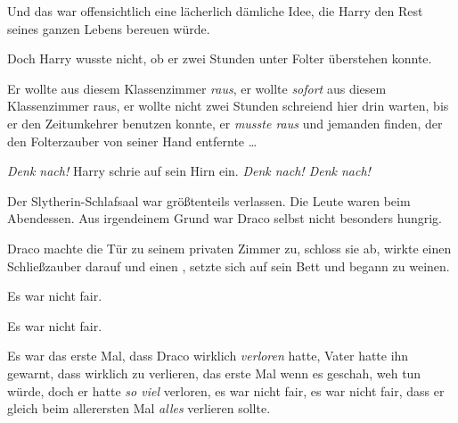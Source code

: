 Und das war offensichtlich eine lächerlich dämliche Idee, die Harry den Rest seines ganzen Lebens bereuen würde.

Doch Harry wusste nicht, ob er zwei Stunden unter Folter überstehen konnte.

Er wollte aus diesem Klassenzimmer \emph{raus}, er wollte \emph{sofort} aus diesem Klassenzimmer raus, er wollte nicht zwei Stunden schreiend hier drin warten, bis er den Zeitumkehrer benutzen konnte, er \emph{musste raus} und jemanden finden, der den Folterzauber von seiner Hand entfernte …

\emph{Denk nach!} Harry schrie auf sein Hirn ein. \emph{Denk nach! Denk nach!}

\later

Der Slytherin-Schlafsaal war größtenteils verlassen. Die Leute waren beim Abendessen. Aus irgendeinem Grund war Draco selbst nicht besonders hungrig.

Draco machte die Tür zu seinem privaten Zimmer zu, schloss sie ab, wirkte einen Schließzauber darauf und einen , setzte sich auf sein Bett und begann zu weinen.

Es war nicht fair.

Es war nicht fair.

Es war das erste Mal, dass Draco wirklich \emph{verloren} hatte, Vater hatte ihn gewarnt, dass wirklich zu verlieren, das erste Mal wenn es geschah, weh tun würde, doch er hatte \emph{so viel} verloren, es war nicht fair, es war nicht fair, dass er gleich beim allerersten Mal \emph{alles} verlieren sollte.

